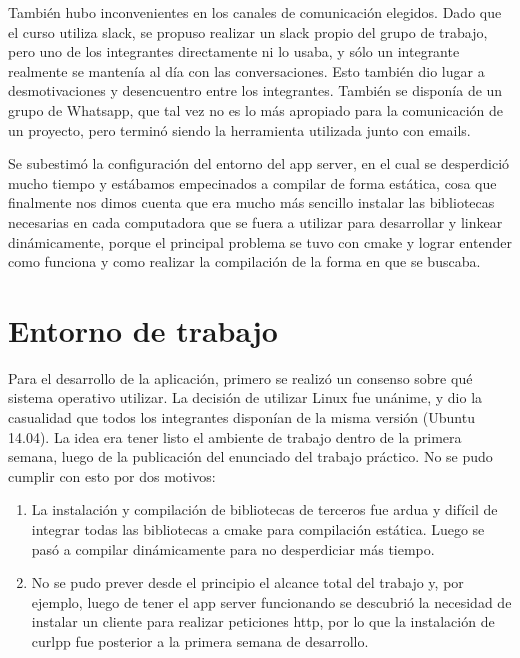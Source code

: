 \documentclass[letterpaper,10pt,spanish]{sphinxmanual}
\begin{document}
También hubo inconvenientes en los canales de comunicación elegidos. Dado que el curso utiliza slack, se propuso realizar un slack propio del grupo de trabajo, pero uno de los integrantes directamente ni lo usaba, y sólo un integrante realmente se mantenía al día con las conversaciones. Esto también dio lugar a desmotivaciones y desencuentro entre los integrantes. También se disponía de un grupo de Whatsapp, que tal vez no es lo más apropiado para la comunicación de un proyecto, pero terminó siendo la herramienta utilizada junto con emails.

Se subestimó la configuración del entorno del app server, en el cual se desperdició mucho tiempo y estábamos empecinados a compilar de forma estática, cosa que finalmente nos dimos cuenta que era mucho más sencillo instalar las bibliotecas necesarias en cada computadora que se fuera a utilizar para desarrollar y linkear dinámicamente, porque el principal problema se tuvo con cmake y lograr entender como funciona y como realizar la compilación de la forma en que se buscaba.


\chapter{Entorno de trabajo}
\label{manual:entorno-de-trabajo}
Para el desarrollo de la aplicación, primero se realizó un consenso sobre qué sistema operativo utilizar. La decisión de utilizar Linux fue unánime, y dio la casualidad que todos los integrantes disponían de la misma versión (Ubuntu 14.04). La idea era tener listo el ambiente de trabajo dentro de la primera semana, luego de la publicación del enunciado del trabajo práctico. No se pudo cumplir con esto por dos motivos:
\begin{enumerate}
\item {} 
La instalación y compilación de bibliotecas de terceros fue ardua y difícil de integrar todas las bibliotecas a cmake para compilación estática. Luego se pasó a compilar dinámicamente para no desperdiciar más tiempo.

\item {} 
No se pudo prever desde el principio el alcance total del trabajo y, por ejemplo, luego de tener el app server funcionando se descubrió la necesidad de instalar un cliente para realizar peticiones http, por lo que la instalación de curlpp fue posterior a la primera semana de desarrollo.

\end{enumerate}
\end{document}
